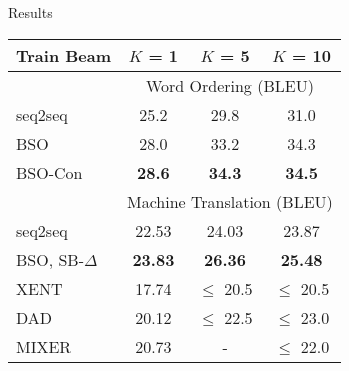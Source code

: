 

\begin{frame}{Results}
  \vspace{-0.2cm}
  \begin{table}
  \centering
    \footnotesize
  \begin{tabular}{lccc}
    \toprule
    Train Beam & $K$ = 1 & $K$ = 5 & $K$ = 10 \\
    \midrule
     & \multicolumn{3}{c}{Word Ordering (BLEU) } \\
    \midrule
    seq2seq & 25.2 & 29.8 & 31.0 \\
    BSO     & 28.0 & 33.2 & 34.3 \\
    BSO-Con & \textbf{28.6} & \textbf{34.3} & \textbf{34.5} \\
    \midrule
    \pause



    \pause
    & \multicolumn{3}{c}{Machine Translation (BLEU) } \\
    seq2seq & 22.53 & 24.03 & 23.87 \\
    BSO, SB-$\Delta$  & \textbf{23.83} & \textbf{26.36} & \textbf{25.48} \\
    XENT & 17.74 & $\leq$ 20.5 & $\leq$ 20.5 \\
    DAD & 20.12 & $\leq$ 22.5 & $\leq$ 23.0 \\
    MIXER & 20.73 & - & $\leq$ 22.0 \\
    \bottomrule
  \end{tabular}
  \label{tab:mtfinal}
\end{table}

\end{frame}



